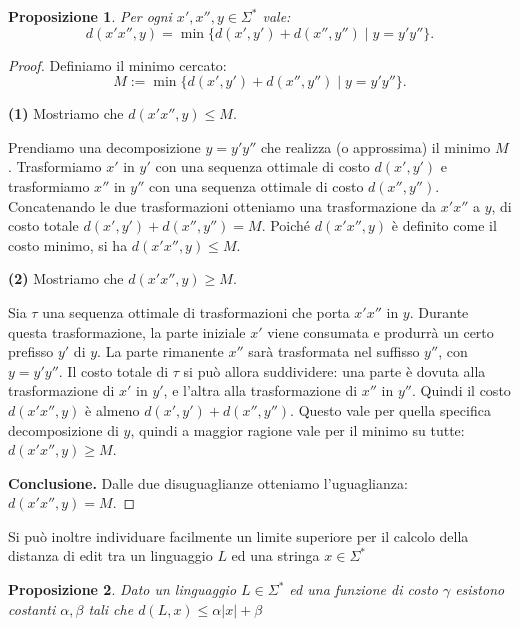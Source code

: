 \documentclass[a4paper,12pt]{report}
\theoremstyle{propositionstyle}
\newtheorem{prop}{Proposizione}[chapter]
\begin{document}
\begin{prop}
    Per ogni $x', x'', y \in \Sigma^*$ vale:
    \[
        d(x'x'', y) = \min\{d(x', y') + d(x'', y'') \mid y = y'y''\}.
    \]
\end{prop}

    \begin{proof}
        Definiamo il minimo cercato:
        \[
            M := \min\{d(x', y') + d(x'', y'') \mid y = y'y''\}.
        \]

        \textbf{(1)} Mostriamo che $d(x'x'', y) \leq M$.

        Prendiamo una decomposizione $y = y'y''$ che realizza (o approssima) il minimo $M$. Trasformiamo $x'$ in $y'$ con una sequenza ottimale di costo $d(x', y')$ e trasformiamo $x''$ in $y''$ con una sequenza ottimale di costo $d(x'', y'')$.
        Concatenando le due trasformazioni otteniamo una trasformazione da $x'x''$ a $y$, di costo totale $d(x', y') + d(x'', y'') = M$.
        Poiché $d(x'x'', y)$ è definito come il costo minimo, si ha $d(x'x'', y) \leq M$.

        \vspace{0.5em}

        \textbf{(2)} Mostriamo che $d(x'x'', y) \geq M$.

        Sia $\tau$ una sequenza ottimale di trasformazioni che porta $x'x''$ in $y$.
        Durante questa trasformazione, la parte iniziale $x'$ viene consumata e produrrà un certo prefisso $y'$ di $y$.
        La parte rimanente $x''$ sarà trasformata nel suffisso $y''$, con $y = y'y''$.
        Il costo totale di $\tau$ si può allora suddividere: una parte è dovuta alla trasformazione di $x'$ in $y'$, e l'altra alla trasformazione di $x''$ in $y''$.
        Quindi il costo $d(x'x'', y)$ è almeno $d(x', y') + d(x'', y'')$.
        Questo vale per quella specifica decomposizione di $y$, quindi a maggior ragione vale per il minimo su tutte: $d(x'x'', y) \geq M$.

        \vspace{0.5em}

        \textbf{Conclusione.} Dalle due disuguaglianze otteniamo l'uguaglianza: $d(x'x'', y) = M$.
    \end{proof}

    Si può inoltre individuare facilmente un limite superiore per il calcolo della distanza di edit
    tra un linguaggio $L$ ed una stringa $x \in \Sigma^*$

    \begin{prop}
        Dato un linguaggio $L \in \Sigma^*$ ed una funzione di costo $\gamma$ esistono costanti $\alpha, \beta$ tali che
        $d(L, x) \leq \alpha \lvert x \rvert + \beta$
    \end{prop}
\end{document}
